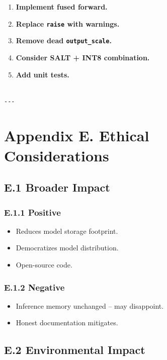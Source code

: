 \begin{enumerate}
\item \textbf{Implement fused forward.}
\item \textbf{Replace \texttt{raise} with warnings.}
\item \textbf{Remove dead \texttt{output\_scale}.}
\item \textbf{Consider SALT + INT8 combination.}
\item \textbf{Add unit tests.}
\end{enumerate}
\begin{lstlisting}

---
\end{lstlisting}


\section{Appendix E. Ethical Considerations}

\subsection{E.1 Broader Impact}

\subsubsection{E.1.1 Positive}

\begin{itemize}
\item Reduces model storage footprint.
\item Democratizes model distribution.
\item Open-source code.

\end{itemize}
\subsubsection{E.1.2 Negative}

\begin{itemize}
\item Inference memory unchanged -- may disappoint.
\item Honest documentation mitigates.

\end{itemize}
\subsection{E.2 Environmental Impact}

